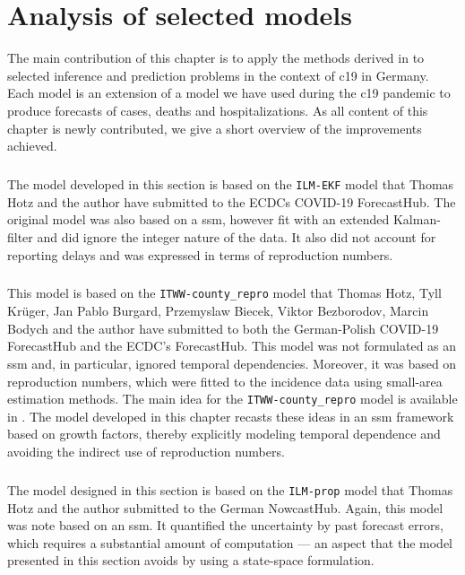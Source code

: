 \chapter{Analysis of selected models}
\label{cha:analysis_of_selected_models}
\glsresetall

\newpage
\begin{tcolorbox}[title={Contributions of this chapter}]
    The main contribution of this chapter is to apply the methods derived in  to selected inference and prediction problems in the context of \gls{c19} in Germany. Each model is an extension of a model we have used during the \gls{c19} pandemic to produce forecasts of cases, deaths and hospitalizations. As all content of this chapter is newly contributed, we give a short overview of the improvements achieved.

    \paragraph{}
    The model developed in this section is based on the \texttt{ILM-EKF} model that Thomas Hotz and the author have submitted to the ECDCs COVID-19 ForecastHub. The original model was also based on  a \gls{ssm}, however fit with an extended Kalman-filter and did ignore the integer nature of the data. It also did not account for reporting delays and was expressed in terms of reproduction numbers.

    \paragraph{}
    This model is based on the \texttt{ITWW-county\_repro} model that Thomas Hotz, Tyll Krüger, Jan Pablo Burgard, Przemyslaw Biecek, Viktor Bezborodov, Marcin Bodych and the author have submitted to both the German-Polish COVID-19 ForecastHub and the ECDC's ForecastHub. This model was not formulated as  an \gls{ssm} and, in particular, ignored temporal dependencies. Moreover, it was based on reproduction numbers, which were fitted to the incidence data using small-area estimation methods. The main idea for the \texttt{ITWW-county\_repro} model is available in \citep{Heyder2022Regional}. The model developed in this chapter recasts these ideas in an \gls{ssm} framework based on growth factors, thereby explicitly modeling temporal dependence and avoiding the indirect use of reproduction numbers.

    \paragraph{}
    The model designed in this section is based on the \texttt{ILM-prop} model that Thomas Hotz and the author submitted to the German NowcastHub. Again, this model was note based on an \gls{ssm}. It quantified the uncertainty by past forecast errors, which requires a substantial amount of computation --- an aspect that the model presented in this section avoids by using a state-space formulation.
\end{tcolorbox}
